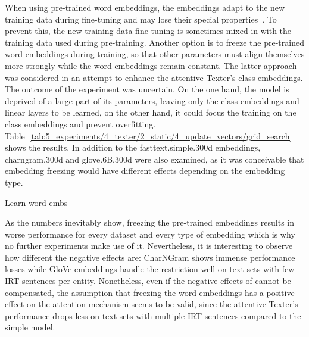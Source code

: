 When using pre-trained word embeddings, the embeddings adapt to the new training data during fine-tuning and may lose their special properties~\cite{He2019AnalyzingTF}. To prevent this, the new training data fine-tuning is sometimes mixed in with the training data used during pre-training. Another option is to freeze the pre-trained word embeddings during training, so that other parameters must align themselves more strongly while the word embeddings remain constant. The latter approach was considered in an attempt to enhance the attentive Texter's class embeddings. The outcome of the experiment was uncertain. On the one hand, the model is deprived of a large part of its parameters, leaving only the class embeddings and linear layers to be learned, on the other hand, it could focus the training on the class embeddings and prevent overfitting. Table~\ref{tab:5_experiments/4_texter/2_static/4_update_vectors/grid_search} shows the results. In addition to the fasttext.simple.300d embeddings, charngram.300d and glove.6B.300d were also examined, as it was conceivable that embedding freezing would have different effects depending on the embedding type.

\begin{table}
    \centering
    
    \caption{Learn word embs}
    \label{tab:5_experiments/4_texter/2_static/4_update_vectors/grid_search}
\end{table}

As the numbers inevitably show, freezing the pre-trained embeddings results in worse performance for every dataset and every type of embedding which is why no further experiments make use of it. Nevertheless, it is interesting to observe how different the negative effects are: CharNGram shows immense performance losses while GloVe embeddings handle the restriction well on text sets with few IRT sentences per entity. Nonetheless, even if the negative effects of cannot be compensated, the assumption that freezing the word embeddings has a positive effect on the attention mechanism seems to be valid, since the attentive Texter's performance drops less on text sets with multiple IRT sentences compared to the simple model.
